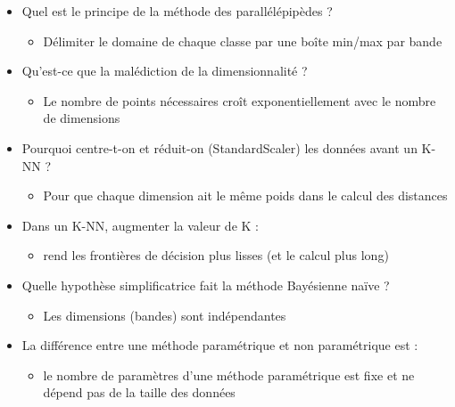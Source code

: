 \documentclass[
  french,
  11pt,
  letterpaper,
  open=any,
  twoside=false,
  french]{scrbook}
\providecommand{\tightlist}{%
  \setlength{\itemsep}{0pt}\setlength{\parskip}{0pt}}
\begin{document}
\begin{itemize}
  \begin{itemize}
  \tightlist
  \item
    une moyenne (harmonique) de la précision et du rappel
  \end{itemize}
\item
  Quel est le principe de la méthode des parallélépipèdes ?

  \begin{itemize}
  \tightlist
  \item
    Délimiter le domaine de chaque classe par une boîte min/max par
    bande
  \end{itemize}
\item
  Qu'est-ce que la malédiction de la dimensionnalité ?

  \begin{itemize}
  \tightlist
  \item
    Le nombre de points nécessaires croît exponentiellement avec le
    nombre de dimensions
  \end{itemize}
\item
  Pourquoi centre-t-on et réduit-on (StandardScaler) les données avant
  un K-NN ?

  \begin{itemize}
  \tightlist
  \item
    Pour que chaque dimension ait le même poids dans le calcul des
    distances
  \end{itemize}
\item
  Dans un K-NN, augmenter la valeur de K :

  \begin{itemize}
  \tightlist
  \item
    rend les frontières de décision plus lisses (et le calcul plus long)
  \end{itemize}
\item
  Quelle hypothèse simplificatrice fait la méthode Bayésienne naïve ?

  \begin{itemize}
  \tightlist
  \item
    Les dimensions (bandes) sont indépendantes
  \end{itemize}
\item
  La différence entre une méthode paramétrique et non paramétrique est :

  \begin{itemize}
  \tightlist
  \item
    le nombre de paramètres d'une méthode paramétrique est fixe et ne
    dépend pas de la taille des données
  \end{itemize}
\end{itemize}
\end{document}
